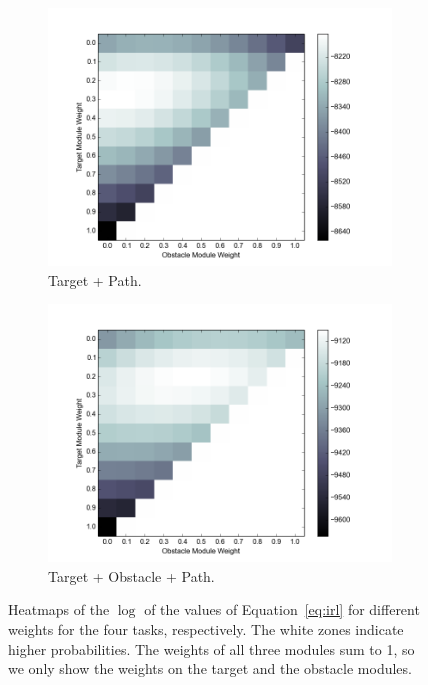 \documentclass[11pt]{article} %
\begin{document}
\begin{figure}[h]
\begin{subfigure}[b]{0.4\textwidth}
\includegraphics[width=\textwidth]{objValuesTask3.png}
\caption{Target + Path. }
\end{subfigure}
\begin{subfigure}[b]{0.4\textwidth}
\includegraphics[width=\textwidth]{objValuesTask4.png}
\caption{Target + Obstacle + Path. }
\end{subfigure}
\caption{Heatmaps of the $\log$ of the values of Equation~\ref{eq:irl} for
different weights for the four tasks, respectively. The white zones indicate
higher probabilities. The weights of all three modules sum to 1, so we only show
the weights on the target and the obstacle modules.
}
\label{fig:heatmap}
\end{figure}
\end{document}

